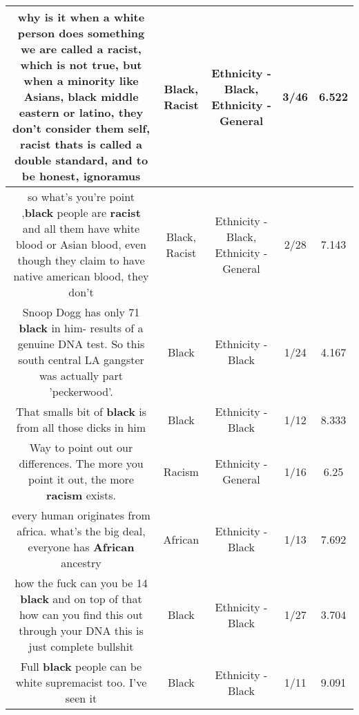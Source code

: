 \documentclass[11pt]{article}
\newlength\mylength
\begin{document}
\begin{center}
\begin{longtable}{|C{.65\mylength}|C{.30\mylength}|C{.12\mylength}|C{.12\mylength}|C{.12\mylength}|}
  \small why is it when a white person does something we are  called a \textbf{racist}, which is not true, but when a minority like Asians, \textbf{black} middle eastern or latino, they don't consider them self, \textbf{racist}  thats is called a double standard, and to be honest, ignoramus\normalsize   & Black, Racist & Ethnicity - Black, Ethnicity - General & 3/46 & 6.522 \\  \hline
  \small so what's you're point ,\textbf{black} people are \textbf{racist} and all them have white blood or Asian blood, even though they claim to have native american blood, they don't\normalsize   & Black, Racist & Ethnicity - Black, Ethnicity - General & 2/28 & 7.143 \\  \hline
  \small Snoop Dogg has only 71 \textbf{black} in him- results of a genuine DNA test. So this south central LA gangster was actually part 'peckerwood'.\normalsize   & Black & Ethnicity - Black & 1/24 & 4.167 \\  \hline
  \small That smalls bit of \textbf{black} is from all those dicks in him\normalsize   & Black & Ethnicity - Black & 1/12 & 8.333 \\  \hline
  \small Way to point out our differences. The more you point it out, the more \textbf{racism} exists.\normalsize   & Racism & Ethnicity - General & 1/16 & 6.25 \\  \hline
  \small every human originates from africa. what's the big deal, everyone has \textbf{African} ancestry\normalsize   & African & Ethnicity - Black & 1/13 & 7.692 \\  \hline
  \small how the fuck can you be 14 \textbf{black} and on top of that how can you find this out through your DNA this is just complete bullshit\normalsize   & Black & Ethnicity - Black & 1/27 & 3.704 \\  \hline
  \small Full \textbf{black} people can be white supremacist too.  I've seen it\normalsize   & Black & Ethnicity - Black & 1/11 & 9.091 \\  \hline

\end{longtable}
\end{center}
\end{document}
